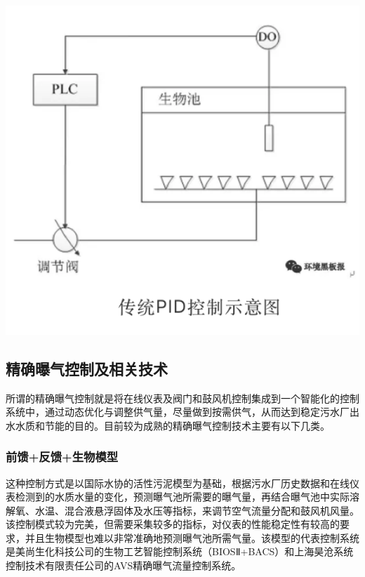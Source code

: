\documentclass[]{book}
\begin{document}
\includegraphics[width=8.33in]{images/bq3}

\hypertarget{ux7cbeux786eux66ddux6c14ux63a7ux5236ux53caux76f8ux5173ux6280ux672f}{%
\subsection{精确曝气控制及相关技术}\label{ux7cbeux786eux66ddux6c14ux63a7ux5236ux53caux76f8ux5173ux6280ux672f}}

所谓的精确曝气控制就是将在线仪表及阀门和鼓风机控制集成到一个智能化的控制系统中，通过动态优化与调整供气量，尽量做到按需供气，从而达到稳定污水厂出水水质和节能的目的。目前较为成熟的精确曝气控制技术主要有以下几类。

\hypertarget{ux524dux9988ux53cdux9988ux751fux7269ux6a21ux578b}{%
\subsubsection{前馈+反馈+生物模型}\label{ux524dux9988ux53cdux9988ux751fux7269ux6a21ux578b}}

这种控制方式是以国际水协的活性污泥模型为基础，根据污水厂历史数据和在线仪表检测到的水质水量的变化，预测曝气池所需要的曝气量，再结合曝气池中实际溶解氧、水温、混合液悬浮固体及水压等指标，来调节空气流量分配和鼓风机风量。该控制模式较为完美，但需要采集较多的指标，对仪表的性能稳定性有较高的要求，并且生物模型也难以非常准确地预测曝气池所需气量。该模型的代表控制系统是美尚生化科技公司的生物工艺智能控制系统（BIOSⅡ+BACS）和上海昊沧系统控制技术有限责任公司的AVS精确曝气流量控制系统。
\end{document}

